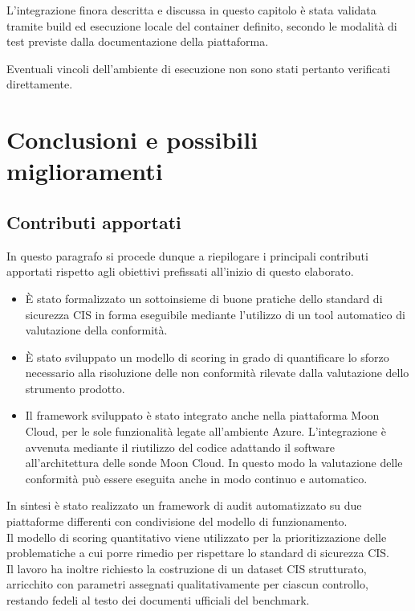 \documentclass[a4paper,11pt]{report}
\begin{document}
L'integrazione finora descritta e discussa in questo capitolo è stata validata tramite build ed esecuzione locale del container definito, secondo le modalità di test previste dalla documentazione della piattaforma.

Eventuali vincoli dell'ambiente di esecuzione non sono stati pertanto verificati direttamente.


\chapter{Conclusioni e possibili miglioramenti}


\section{Contributi apportati}

In questo paragrafo si procede dunque a riepilogare i principali contributi apportati rispetto agli obiettivi prefissati all'inizio di questo elaborato.\\
\begin{itemize}
\item È stato formalizzato un sottoinsieme di buone pratiche dello standard di sicurezza CIS in forma eseguibile mediante l'utilizzo di un tool automatico di valutazione della conformità.
\item È stato sviluppato un modello di scoring in grado di quantificare lo sforzo necessario alla risoluzione delle non conformità rilevate dalla valutazione dello strumento prodotto.
\item Il framework sviluppato è stato integrato anche nella piattaforma Moon Cloud, per le sole funzionalità legate all'ambiente Azure. L'integrazione è avvenuta mediante il riutilizzo del codice adattando il software all'architettura delle sonde Moon Cloud. In questo modo la valutazione delle conformità può essere eseguita anche in modo continuo e automatico.
\end{itemize}

In sintesi è stato realizzato un framework di audit automatizzato su due piattaforme differenti con condivisione del modello di funzionamento.\\
Il modello di scoring quantitativo viene utilizzato per la prioritizzazione delle problematiche a cui porre rimedio per rispettare lo standard di sicurezza CIS.\\

Il lavoro ha inoltre richiesto la costruzione di un dataset CIS strutturato, arricchito con parametri assegnati qualitativamente per ciascun controllo, restando fedeli al testo dei documenti ufficiali del benchmark.
\end{document}
